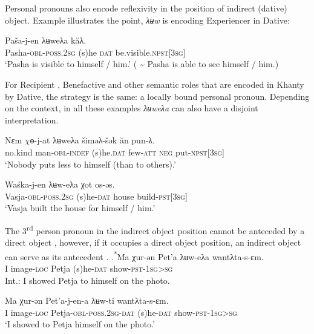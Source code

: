 \documentclass[output=paper]{langscibook}
\begin{document}
Personal pronouns also encode reflexivity in the position of indirect (dative) object. Example  illustrates the point, \textit{λʉw} is encoding Experiencer in Dative:

\ea 
\label{ex:Volkova:22}
 \gll Paša-j-en λʉweλa kăλ.\\
 Pasha\textsc{{}-obl-poss.2sg (}s)he \textsc{dat} be.visible.\textsc{npst[3sg]}\\
 \glt ‘Pasha is visible to himself / him.’ ( {\textasciitilde} Pasha is able to see himself / him.)
\z
%

For Recipient , Benefactive  and other semantic roles that are encoded in Khanty by Dative, the strategy is the same: a locally bound personal pronoun. Depending on the context, in all these examples \textit{λʉweλa} can also have a disjoint interpretation. 

\ea 
\label{ex:Volkova:23}
 \gll Nɛm $\chi ɵ$-j-at λʉweλa šiməλ-šək ăn pun-λ.\\
 no.kind man-\textsc{obl-indef} (s)he\textsc{.dat} few\textsc{{}-att} \textsc{neg} put\textsc{{}-npst[3sg]}\\
 \glt ‘Nobody puts less to himself (than to others).’
\z

 
\ea 
\label{ex:Volkova:24}
 \gll Waśka{}-j-en λʉw-eλa χot os-əs.\\
 Vasja\textsc{{}-obl-poss.2sg} (s)he\textsc{{}-dat} house build\textsc{{}-pst[3sg]}\\
 \glt ‘Vasja built the house for himself / him.’
\z

The 3\textsuperscript{rd} person pronoun in the indirect object position cannot be anteceded by a direct object , however, if it occupies a direct object position, an indirect object can serve as its antecedent .
\ea 
\label{ex:Volkova:25}
	\ea
	\label{ex:Volkova:25a}
  	 \gll .\textsuperscript{*}Ma χur-ən Pet{}'a λʉw-eλa wantλta-s-ɛm.\\
  	  I image-\textsc{loc} Petja (s)he\textsc{{}-dat} show\textsc{{}-pst-1sg>sg}\\
  	 \glt Int.: I showed Petja to himself on the photo.

	\ex
	\label{ex:Volkova:25b}
  	 \gll Ma χur-ən Pet{}'a{}-j{}-en{}-a λʉw-ti wantλta-s-ɛm.\\
  	 I image-\textsc{loc} Petja-\textsc{obl-poss.2sg-dat} (s)he\textsc{{}-dat} show\textsc{{}-pst-1sg>sg}\\
  	 \glt ‘I showed to Petja himself on the photo.’
	\z
\z
\end{document}
